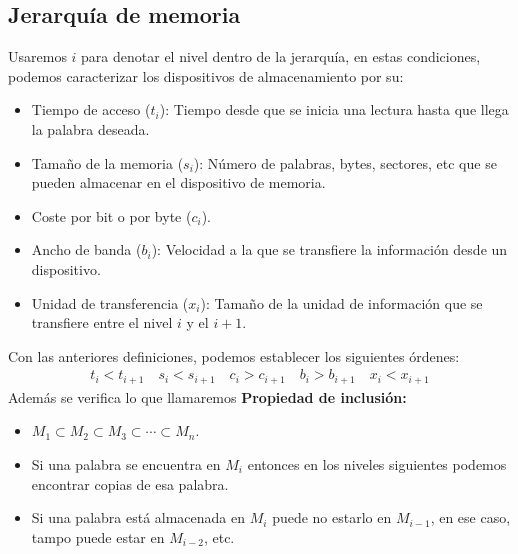 \subsection{Jerarquía de memoria}
Usaremos $i$ para denotar el nivel dentro de la jerarquía, en estas condiciones, podemos caracterizar los dispositivos de almacenamiento por su:
\begin{itemize}
    \item Tiempo de acceso ($t_i$): Tiempo desde que se inicia una lectura hasta que llega la palabra deseada.
    \item Tamaño de la memoria ($s_i$): Número de palabras, bytes, sectores, etc que se pueden almacenar en el dispositivo de memoria.
    \item Coste por bit o por byte ($c_i$).
    \item Ancho de banda ($b_i$): Velocidad a la que se transfiere la información desde un dispositivo.
    \item Unidad de transferencia ($x_i$): Tamaño de la unidad de información que se transfiere entre el nivel $i$ y el $i+1$.
\end{itemize}
Con las anteriores definiciones, podemos establecer los siguientes órdenes:
\begin{align*}
    t_i < t_{i+1} \quad s_i < s_{i+1} \quad c_i > c_{i+1} \quad b_i > b_{i+1} \quad x_i < x_{i+1}
\end{align*}
Además se verifica lo que llamaremos \textbf{Propiedad de inclusión:}
\begin{itemize}
    \item $M_1 \subset M_2 \subset M_3 \subset \cdots \subset M_n$.
    \item Si una palabra se encuentra en $M_i$ entonces en los niveles siguientes podemos encontrar copias de esa palabra.
    \item Si una palabra está almacenada en $M_i$ puede no estarlo en $M_{i-1}$, en ese caso, tampo puede estar en $M_{i-2}$, etc.
\end{itemize}
